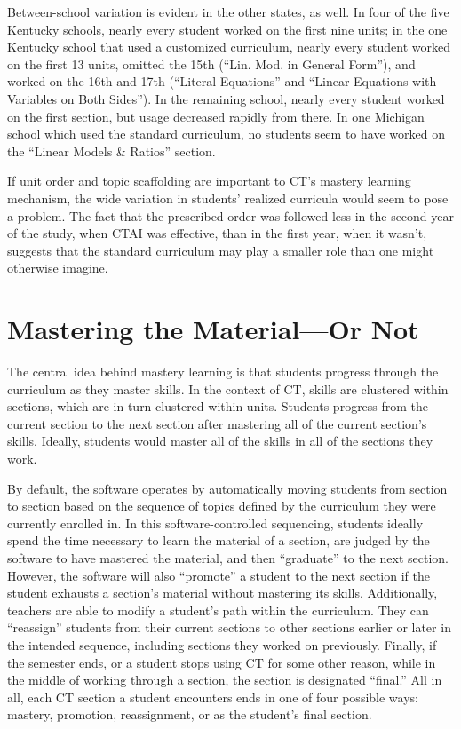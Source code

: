 \documentclass[12pt]{article}\usepackage[]{graphicx}\usepackage[]{color}
\begin{document}
Between-school variation is evident in the other states, as well.
In four of the five Kentucky schools, nearly every student worked on
the first nine units; in the one Kentucky school that used a
customized curriculum, nearly every student worked on the first 13
units, omitted the 15th (``Lin. Mod. in General Form''), and worked on
the 16th and 17th (``Literal Equations'' and ``Linear Equations with Variables on Both Sides'').
In the remaining school, nearly every student worked on the first
section, but usage decreased rapidly from there.
In one Michigan school which used the standard curriculum,
no students seem to have worked on the ``Linear Models \& Ratios'' section.

If unit order and topic scaffolding are important to CT's mastery
learning mechanism, the wide variation in students' realized curricula
would seem to pose a problem.
The fact that the prescribed order was followed less in the second
year of the study, when CTAI was effective, than in the first year,
when it wasn't, suggests that the standard curriculum may play a
smaller role than one might otherwise imagine.

\section{Mastering the Material---Or Not}\label{sec:mastery}
The central idea behind mastery learning is that students progress
through the curriculum as they master skills.
In the context of CT, skills are clustered within sections, which are
in turn clustered within units.
Students progress from the current section to the next section after
mastering all of the current section's skills.
Ideally, students would master all of the skills in all of the
sections they work.

By default, the software operates by automatically moving students
from section to section based on the sequence of topics defined by the
curriculum they were currently enrolled in. In this
software-controlled sequencing, students ideally spend the time
necessary to learn the material of a section, are judged by the
software to have mastered the material, and then ``graduate'' to the
next section.
However, the software will also ``promote'' a student to the next
section if the student exhausts a section's material without mastering
its skills.
Additionally, teachers are able to modify a student's path within the curriculum.
They can ``reassign'' students from their current sections to other
sections earlier or later in the intended sequence, including sections
they worked on previously.
Finally, if the semester ends, or a student stops using CT for some
other reason, while in the middle of working through a
section, the section is designated ``final.''
All in all, each CT section a student encounters ends in one of four possible ways:
mastery, promotion, reassignment, or as the student's final section.
\end{document}
